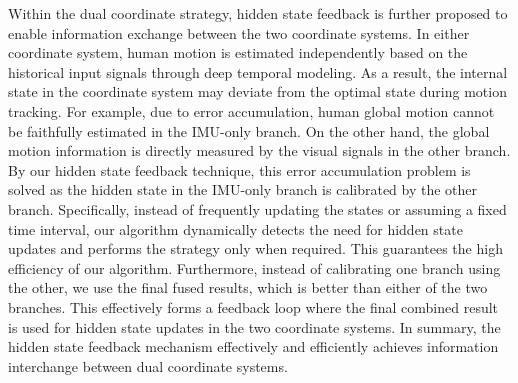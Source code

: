 %
\par
%
Within the dual coordinate strategy, hidden state feedback is further proposed to enable information exchange between the two coordinate systems.
%
In either coordinate system, human motion is estimated independently based on the historical input signals through deep temporal modeling.
%
As a result, the internal state in the coordinate system may deviate from the optimal state during motion tracking. 
%
For example, due to error accumulation, human global motion cannot be faithfully estimated
in the IMU-only branch.
%
On the other hand, the global motion information is directly measured by the visual signals in the other branch.
%
By our hidden state feedback technique, this error accumulation problem is solved as the hidden state in the IMU-only branch is calibrated by the other branch.
%
Specifically, instead of frequently updating the states or assuming a fixed time interval, our algorithm dynamically detects the need for hidden state updates and performs the strategy only when required.
%
This guarantees the high efficiency of our algorithm.
%
Furthermore, instead of calibrating one branch using the other, we use the final fused results, which is better than either of the two branches.
%
This effectively forms a feedback loop where the final combined result is used for hidden state updates in the two coordinate systems.
%
In summary, the hidden state feedback mechanism effectively and efficiently achieves information interchange between dual coordinate systems.



%






